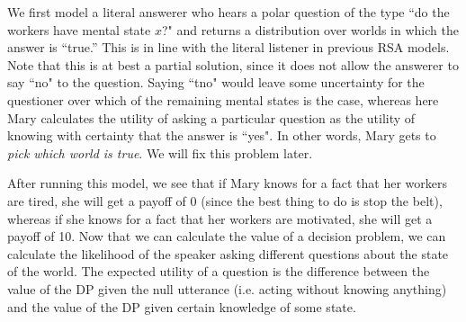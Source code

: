 \documentclass[12pt]{amsart}
\begin{document}
We first model a literal answerer who hears a polar question of the type ``do the workers have mental state $x$?" and returns a distribution over worlds in which the answer is ``true.'' This is in line with the literal listener in previous RSA models. Note that this is at best a partial solution, since it does not allow the answerer to say ``no" to the question. Saying ``tno" would leave some uncertainty for the questioner over which of the remaining mental states is the case, whereas here Mary calculates the utility of asking a particular question as the utility of knowing with certainty that the answer is ``yes". In other words, Mary gets to \emph{pick which world is true}. We will fix this problem later.

%
%
%

After running this model, we see that if Mary knows for a fact that her workers are tired, she will get a payoff of 0 (since the best thing to do is stop the belt), whereas if she knows for a fact that her workers are motivated, she will get a payoff of 10. Now that we can calculate the value of a decision problem, we can calculate the likelihood of the speaker asking different questions about the state of the world. The expected utility of a question is the difference between the value of the DP given the null utterance (i.e. acting without knowing anything) and the value of the DP given certain knowledge of some state.

%
%
\end{document}

